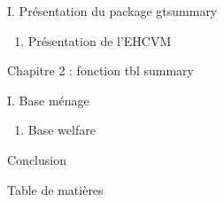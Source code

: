 \documentclass[
]{article}
\providecommand{\tightlist}{%
  \setlength{\itemsep}{0pt}\setlength{\parskip}{0pt}}
\begin{document}
I. Présentation du package gtsummary

\begin{enumerate}
\def\labelenumi{\Roman{enumi}.}
\setcounter{enumi}{1}
\tightlist
\item
  Présentation de l'EHCVM
\end{enumerate}

Chapitre 2 : fonction tbl summary

I. Base ménage

\begin{enumerate}
\def\labelenumi{\Roman{enumi}.}
\setcounter{enumi}{1}
\tightlist
\item
  Base welfare
\end{enumerate}

Conclusion

Table de matières
\end{document}
